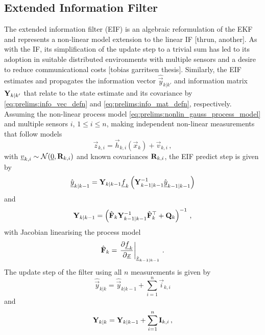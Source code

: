 \subsection{Extended Information Filter}\label{subsec:prelims:eif}
The extended information filter (EIF) is an algebraic reformulation of the EKF and represents a non-linear model extension to the linear IF [thrun, another]. As with the IF, its simplification of the update step to a trivial sum has led to its adoption in suitable distributed environments with multiple sensors and a desire to reduce communicational costs [tobias garritsen thesis]. Similarly, the EIF estimates and propagates the information vector $\hat{\vec{y}}_{k|k'}$ and information matrix ${{\mathbf{Y}}}_{k|k'}$ that relate to the state estimate and its covariance by \eqref{eq:prelims:info_vec_defn} and \eqref{eq:prelims:info_mat_defn}, respectively. Assuming the non-linear process model \eqref{eq:prelims:nonlin_gauss_process_model} and multiple sensors $i$, $1\leq i \leq n$, making independent non-linear measurements that follow models
\begin{equation}
    \vec{z}_{k,i} = \vec{h}_{k,i}\left(\vec{x}_k\right) + \vec{v}_{k,i}\,,
\end{equation}
with ${\underline{v}}_{k,i}\sim\mathcal{N}({\underline{0}},{{\mathbf{R}}}_{k,i})$ and known covariances ${{\mathbf{R}}}_{k,i}$, the EIF predict step is given by
\begin{equation}\label{eq:prelims:eif_info_vec_predict}
    \hat{{\underline{y}}}_{k|k-1} = {{\mathbf{Y}}}_{k|k-1}{\underline{f}}_k\left({{\mathbf{Y}}}_{k-1|k-1}^{-1}\hat{{\underline{y}}}_{k-1|k-1}\right)
\end{equation}
and
\begin{equation}\label{eq:prelims:eif_info_mat_predict}
    {\ensuremath{{\mathbf{Y}}}}_{k|k-1} = \left(\hat{{{\mathbf{F}}}}_k{{\mathbf{Y}}}_{k-1|k-1}^{-1}\hat{{{\mathbf{F}}}}_k^\top + {{\mathbf{Q}}}_k\right)^{-1}\,,
\end{equation}
with Jacobian linearising the process model
\begin{equation}
    \hat{{{\mathbf{F}}}}_k = \left.\frac{\partial {\underline{f}}_k}{\partial {\underline{x}}}\right|_{\hat{{\underline{x}}}_{k-1|k-1}}\,.
\end{equation}
The update step of the filter using all $n$ measurements is given by
\begin{equation}\label{eq:prelims:eif_info_vec_update}
    \hat{\vec{y}}_{k|k} = \hat{\vec{y}}_{k|k-1} + \sum_{i=1}^n\vec{i}_{k,i}
\end{equation}
and
\begin{equation}\label{eq:prelims:eif_info_mat_update}
    {\ensuremath{{\mathbf{Y}}}}_{k|k} = {{\mathbf{Y}}}_{k|k-1} + \sum_{i=1}^n{{\mathbf{I}}}_{k,i}\,,
\end{equation}

